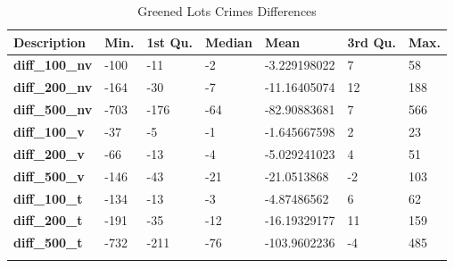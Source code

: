 \documentclass{article}
\begin{document}
\begin{table}[H]
\begin{center}
\caption{\label{tab:ab}Greened Lots Crimes Differences}
\begin{tabular}{lllllll}
\hline
\textbf{Description}             & \textbf{Min.} & \textbf{1st Qu.} & \textbf{Median} & \textbf{Mean} & \textbf{3rd Qu.} & \textbf{Max.} \\ \hline
\textbf{diff\_100\_nv}           & -100          & -11              & -2              & -3.229198022  & 7                & 58            \\
\textbf{diff\_200\_nv}           & -164          & -30              & -7              & -11.16405074  & 12               & 188           \\
\textbf{diff\_500\_nv}           & -703          & -176             & -64             & -82.90883681  & 7                & 566           \\
\textbf{diff\_100\_v}            & -37           & -5               & -1              & -1.645667598  & 2                & 23            \\
\textbf{diff\_200\_v}            & -66           & -13              & -4              & -5.029241023  & 4                & 51            \\
\textbf{diff\_500\_v}            & -146          & -43              & -21             & -21.0513868   & -2               & 103           \\
\textbf{diff\_100\_t}            & -134          & -13              & -3              & -4.87486562   & 6                & 62            \\
\textbf{diff\_200\_t}            & -191          & -35              & -12             & -16.19329177  & 11               & 159           \\
\textbf{diff\_500\_t}            & -732          & -211             & -76             & -103.9602236  & -4               & 485           \\
                                 &               &                  &                 &               &                  &              
\end{tabular}
\end{center}
\end{table}
\end{document}
